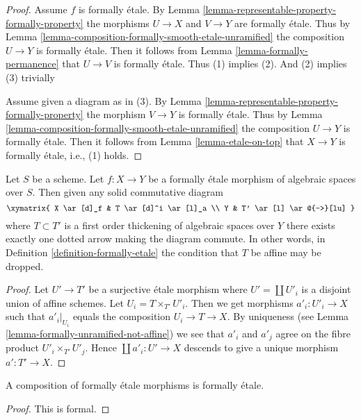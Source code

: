 \begin{proof}
Assume $f$ is formally \'etale. By
Lemma \ref{lemma-representable-property-formally-property}
the morphisms $U \to X$ and $V \to Y$ are formally \'etale. Thus by
Lemma \ref{lemma-composition-formally-smooth-etale-unramified}
the composition $U \to Y$ is formally \'etale. Then it follows from
Lemma \ref{lemma-formally-permanence}
that $U \to V$ is formally \'etale. Thus (1) implies (2). And (2)
implies (3) trivially

\medskip\noindent
Assume given a diagram as in (3). By
Lemma \ref{lemma-representable-property-formally-property}
the morphism $V \to Y$ is formally \'etale. Thus by
Lemma \ref{lemma-composition-formally-smooth-etale-unramified}
the composition $U \to Y$ is formally \'etale. Then it follows from
Lemma \ref{lemma-etale-on-top}
that $X \to Y$ is formally \'etale, i.e., (1) holds.
\end{proof}

\begin{lemma}
\label{lemma-formally-etale-not-affine}
Let $S$ be a scheme.
Let $f : X \to Y$ be a formally \'etale morphism of algebraic spaces over $S$.
Then given any solid commutative diagram
$$
\xymatrix{
X \ar[d]_f & T \ar[d]^i \ar[l]_a \\
Y & T' \ar[l] \ar@{-->}[lu]
}
$$
where $T \subset T'$ is a first order thickening of algebraic spaces
over $Y$ there exists exactly one dotted arrow making the diagram commute.
In other words, in
Definition \ref{definition-formally-etale}
the condition that $T$ be affine may be dropped.
\end{lemma}

\begin{proof}
Let $U' \to T'$ be a surjective \'etale morphism where $U' = \coprod U'_i$
is a disjoint union of affine schemes. Let
$U_i = T \times_{T'} U'_i$. Then we get morphisms
$a'_i : U'_i \to X$ such that $a'_i|_{U_i}$ equals the composition
$U_i \to T \to X$. By uniqueness (see
Lemma \ref{lemma-formally-unramified-not-affine})
we see that $a'_i$ and $a'_j$ agree on the fibre product
$U'_i \times_{T'} U'_j$. Hence $\coprod a'_i : U' \to X$
descends to give a unique morphism $a' : T' \to X$.
\end{proof}

\begin{lemma}
\label{lemma-composition-formally-etale}
A composition of formally \'etale morphisms is formally \'etale.
\end{lemma}

\begin{proof}
This is formal.
\end{proof}

